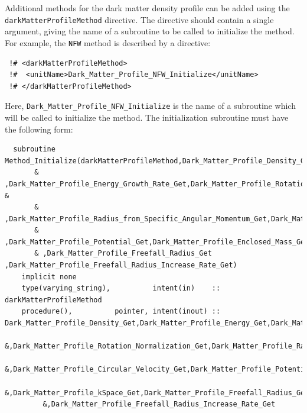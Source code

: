 Additional methods for the dark matter density profile can be added using the {\tt darkMatterProfileMethod} directive. The directive should contain a single argument, giving the name of a subroutine to be called to initialize the method. For example, the {\tt NFW} method is described by a directive:
\begin{verbatim}
 !# <darkMatterProfileMethod>
 !#  <unitName>Dark_Matter_Profile_NFW_Initialize</unitName>
 !# </darkMatterProfileMethod>
\end{verbatim}
Here, {\tt Dark\_Matter\_Profile\_NFW\_Initialize} is the name of a subroutine which will be called to initialize the method. The initialization subroutine must have the following form:
\begin{verbatim}
  subroutine Method_Initialize(darkMatterProfileMethod,Dark_Matter_Profile_Density_Get,Dark_Matter_Profile_Energy_Get&
       & ,Dark_Matter_Profile_Energy_Growth_Rate_Get,Dark_Matter_Profile_Rotation_Normalization_Get &
       & ,Dark_Matter_Profile_Radius_from_Specific_Angular_Momentum_Get,Dark_Matter_Profile_Circular_Velocity_Get&
       & ,Dark_Matter_Profile_Potential_Get,Dark_Matter_Profile_Enclosed_Mass_Get,Dark_Matter_Profile_kSpace_Get&
       & ,Dark_Matter_Profile_Freefall_Radius_Get ,Dark_Matter_Profile_Freefall_Radius_Increase_Rate_Get)
    implicit none
    type(varying_string),          intent(in)    :: darkMatterProfileMethod
    procedure(),          pointer, intent(inout) :: Dark_Matter_Profile_Density_Get,Dark_Matter_Profile_Energy_Get,Dark_Matter_Profile_Energy_Growth_Rate_Get&
         &,Dark_Matter_Profile_Rotation_Normalization_Get,Dark_Matter_Profile_Radius_from_Specific_Angular_Momentum_Get&
         &,Dark_Matter_Profile_Circular_Velocity_Get,Dark_Matter_Profile_Potential_Get,Dark_Matter_Profile_Enclosed_Mass_Get&
         &,Dark_Matter_Profile_kSpace_Get,Dark_Matter_Profile_Freefall_Radius_Get&
         &,Dark_Matter_Profile_Freefall_Radius_Increase_Rate_Get


\end{verbatim}
